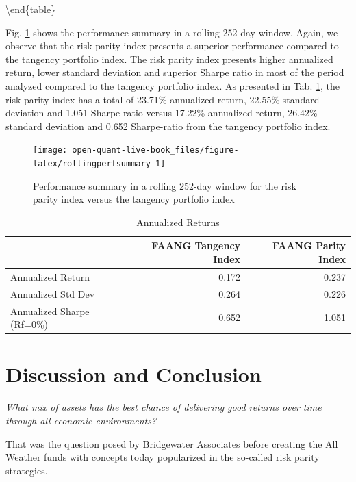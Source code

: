 \documentclass[]{book}
\theoremstyle{definition}
\theoremstyle{definition}
\theoremstyle{definition}
\theoremstyle{remark}
\begin{document}
\textbackslash{}end\{table\}

Fig. \ref{fig:rollingperfsummary} shows the performance summary in a
rolling 252-day window. Again, we observe that the risk parity index
presents a superior performance compared to the tangency portfolio
index. The risk parity index presents higher annualized return, lower
standard deviation and superior Sharpe ratio in most of the period
analyzed compared to the tangency portfolio index. As presented in Tab.
\ref{tab:annualret}, the risk parity index has a total of 23.71\%
annualized return, 22.55\% standard deviation and 1.051 Sharpe-ratio
versus 17.22\% annualized return, 26.42\% standard deviation and 0.652
Sharpe-ratio from the tangency portfolio index.

\begin{figure}[H]

{\centering \texttt{[image: open-quant-live-book\_files/figure-latex/rollingperfsummary-1]} 

}

\caption{Performance summary in a rolling 252-day window for the risk parity index versus the tangency portfolio index}\label{fig:rollingperfsummary}
\end{figure}

\begin{table}[t]

\caption{\label{tab:annualret}Annualized Returns}
\centering
\begin{tabular}{lrr}
\toprule
  & FAANG Tangency Index & FAANG Parity Index\\
\midrule
Annualized Return & 0.172 & 0.237\\
Annualized Std Dev & 0.264 & 0.226\\
Annualized Sharpe (Rf=0\%) & 0.652 & 1.051\\
\bottomrule
\end{tabular}
\end{table}

\section{Discussion and Conclusion}\label{discussion-and-conclusion}

\emph{What mix of assets has the best chance of delivering good returns
over time through all economic environments?}

That was the question posed by Bridgewater Associates before creating
the All Weather funds with concepts today popularized in the so-called
risk parity strategies.
\end{document}
